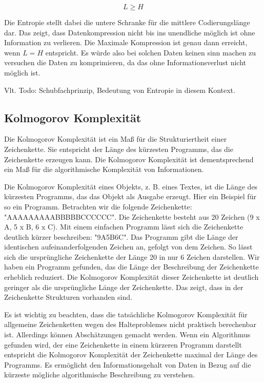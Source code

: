 \documentclass[conference]{IEEEtran}
\begin{document}
\begin{equation}
  \label{eq:sct}
  L \ge H
\end{equation}

Die Entropie stellt dabei die untere Schranke für die mittlere Codierungslänge dar.
Das zeigt, dass Datenkompression nicht bis ins unendliche möglich ist ohne
Information zu verlieren.
Die Maximale Kompression ist genau dann erreicht, wenn $L = H$ entspricht.
Es würde also bei solchen Daten keinen sinn machen zu versuchen die Daten
zu komprimieren, da das ohne Informationsverlust nicht möglich ist.

Vlt. Todo: Schubfachprinzip, Bedeutung von Entropie in diesem Kontext.

\subsection{Kolmogorov Komplexität}

Die Kolmogorov Komplexität ist ein Maß für die Strukturiertheit einer Zeichenkette.
Sie entspricht der Länge des kürzesten Programms, das die Zeichenkette erzeugen
kann. \cite{li}
Die Kolmogorov Komplexität ist dementsprechend ein Maß für die algorithmische Komplexität
von Informationen.

Die Kolmogorov Komplexität eines Objekts, z. B. eines Textes, ist die Länge
des kürzesten Programms, das das Objekt als Ausgabe erzeugt.
Hier ein Beispiel für so ein Programm.
Betrachten wir die folgende Zeichenkette: "AAAAAAAAABBBBBCCCCCC".
Die Zeichenkette besteht aus 20 Zeichen (9 x A, 5 x B, 6 x C).
Mit einem einfachen Programm lässt sich die Zeichenkette deutlich kürzer
beschreiben: "9A5B6C".
Das Programm gibt die Länge der identischen aufeinanderfolgenden Zeichen an,
gefolgt von dem Zeichen.
So lässt sich die ursprüngliche Zeichenkette der Länge 20 in nur 6 Zeichen darstellen.
Wir haben ein Programm gefunden, das die Länge der Beschreibung der Zeichenkette
erheblich reduziert.
Die Kolmogorov Komplexität dieser Zeichenkette ist deutlich geringer als
die ursprüngliche Länge der Zeichenkette.
Das zeigt, dass in der Zeichenkette Strukturen vorhanden sind.

Es ist wichtig zu beachten, dass die tatsächliche Kolmogorov Komplexität für
allgemeine Zeichenketten wegen des Halteproblemes nicht praktisch
berechenbar ist. \cite{OPPaper}
Allerdings können Abschätzungen gemacht werden.
Wenn ein Algorithmus gefunden wird, der eine Zeichenkette in einem kürzeren
Programm darstellt entspricht die Kolmogorov Komplexität der Zeichenkette
maximal der Länge des Programms.
Es ermöglicht den Informationsgehalt von Daten in
Bezug auf die kürzeste mögliche algorithmische Beschreibung zu verstehen.
\end{document}
